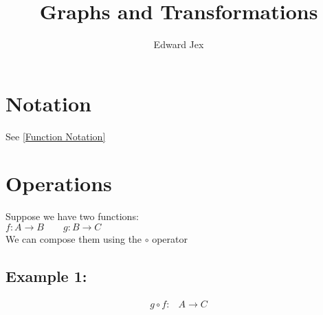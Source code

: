 \documentclass[a4paper,12pt]{article}
\begin{document}
\title{Graphs and Transformations}	
\author{Edward Jex}
\maketitle
\section*{Notation}
See \href{https://github.com/Jex-y/ALevelFurtherMathsNotes/blob/master/output/Pure/FunctionNotation.pdf}{[Function Notation]}\\
\section*{Operations}
Suppose we have two functions:\\ 
$f: A \rightarrow B \qquad g: B \rightarrow C $\\
We can compose them using the $ \circ $ operator\\
\subsection*{Example 1:}
\begin{align*}
g \circ f: & A \rightarrow C \\
\end{align*}
\end{document}
